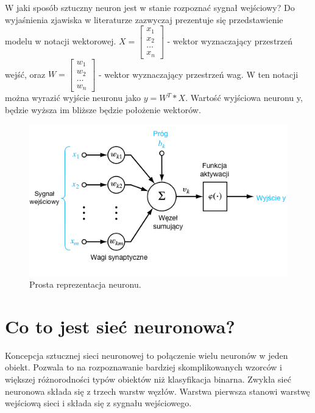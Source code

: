 \documentclass[12pt,a4paper,twoside,titlepage,openright]{book}
\begin{document}
W jaki sposób sztuczny neuron jest w stanie rozpoznać sygnał wejściowy? Do wyjaśnienia zjawiska w literaturze zazwyczaj prezentuje się przedstawienie modelu w notacji wektorowej.
\newline
\(X = \begin{bmatrix} x_{1} \\ x_{2} \\ \dots \\ x_{n} \end{bmatrix} \) - wektor wyznaczający przestrzeń wejść, oraz \newline
\(W = \begin{bmatrix} w_{1} \\ w_{2} \\ \dots \\ w_{n} \end{bmatrix} \) - wektor wyznaczający przestrzeń wag. \newline W ten notacji można wyrazić wyjście neuronu jako \(y= W^T * X\). Wartość wyjściowa neuronu y, będzie wyższa im bliższe będzie położenie wektorów.

\begin{figure}[h]
	\centering
			\includegraphics[resolution=100, scale=0.7]{Neuron.png}
		\caption{Prosta reprezentacja neuronu.}
\end{figure}


\section{Co to jest sieć neuronowa?}
Koncepcja sztucznej sieci neuronowej to połączenie wielu neuronów w jeden obiekt. Pozwala to na rozpoznawanie bardziej skomplikowanych wzorców i większej różnorodności typów obiektów niż klasyfikacja binarna. Zwykła sieć neuronowa składa się z trzech warstw węzłów. Warstwa pierwsza stanowi warstwę wejściową sieci i składa się z sygnału wejściowego.
\end{document}
